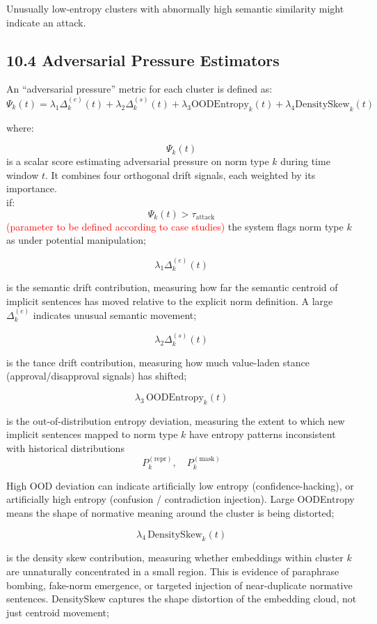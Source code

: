 \documentclass{article}
\begin{document}
Unusually low-entropy clusters with abnormally high semantic similarity might indicate an attack.

\subsection*{10.4  Adversarial Pressure Estimators}
An ``adversarial pressure'' metric for each cluster is defined as:
\[
\Psi_k(t) =
\lambda_1 \Delta_k^{(e)}(t) +
\lambda_2 \Delta_k^{(s)}(t) +
\lambda_3 \text{OODEntropy}_k(t) +
\lambda_4 \text{DensitySkew}_k(t)
\]

where: 

\[
\Psi_k(t)
\]
is a scalar score estimating adversarial pressure on norm type \(k\) during time window \(t\).
It combines four orthogonal drift signals, each weighted by its importance. \\

if:
\[
\Psi_k(t) > \tau_{\text{attack}}
\]
\textcolor{red}{(parameter to be defined according to case studies)}
the system flags norm type \(k\) as under potential manipulation; 

\[
\lambda_1 \Delta_k^{(e)}(t)
\]

is the semantic drift contribution, measuring how far the semantic centroid of implicit sentences has moved relative to the explicit norm definition. A large \(\Delta_k^{(e)}\) indicates unusual semantic movement;

\[
\lambda_2 \Delta_k^{(s)}(t)
\]

is the tance drift contribution, measuring how much value-laden stance (approval/disapproval signals) has shifted;

\[
\lambda_3 \,\text{OODEntropy}_k(t)
\]

is the out-of-distribution entropy deviation, measuring the extent to which new implicit sentences mapped to norm type \(k\) have entropy patterns inconsistent with historical distributions
\[
P_k^{(\text{repr})},\quad P_k^{(\text{mask})}
\]
    
High OOD deviation can indicate artificially low entropy (confidence-hacking), or artificially high entropy (confusion / contradiction injection).
Large OODEntropy means the shape of normative meaning around the cluster is being distorted;

\[
\lambda_4 \,\text{DensitySkew}_k(t)
\]

is the density skew contribution, measuring whether embeddings within cluster \(k\) are unnaturally concentrated in a small region. This is evidence of paraphrase bombing, fake-norm emergence, or targeted injection of near-duplicate normative sentences. DensitySkew captures the shape distortion of the embedding cloud, not just centroid movement;
\end{document}
